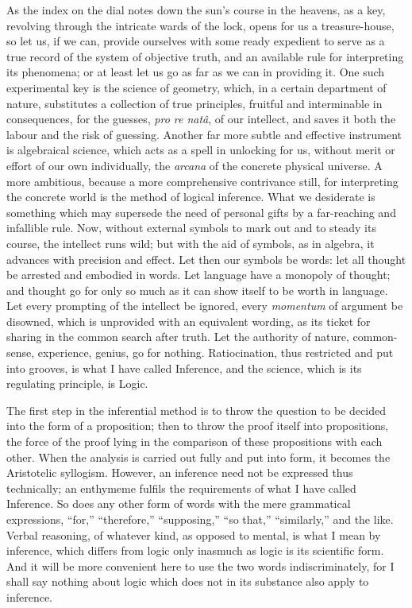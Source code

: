 As the index on the dial notes down the sun's course in the
heavens, as a key, revolving through the intricate wards of the lock,
opens for us a treasure-house, so let us, if we can, provide ourselves
with some ready expedient to serve as a true record of the system of
objective truth, and an available rule for interpreting its phenomena;
or at least let us go as far as we can in providing it. One such
experimental key is the science of geometry, which, in a certain
department of nature, substitutes a collection of true principles,
fruitful and interminable in consequences, for the guesses, \emph{pro re
natâ}, of our intellect, and saves it both the labour and the risk
of guessing. Another far more subtle and effective instrument is
algebraical science, which acts as a spell in unlocking for us,
without merit or effort of our own individually, the \emph{arcana} of
the concrete physical universe. A more ambitious, because a more
comprehensive contrivance still, for interpreting the concrete world
is the method of logical inference. What we desiderate is
something which may supersede the need of personal gifts by a
far-reaching and infallible rule. Now, without external symbols to
mark out and to steady its course, the intellect runs wild; but with
the aid of symbols, as in algebra, it advances with precision and
effect. Let then our symbols be words: let all thought be arrested and
embodied in words. Let language have a monopoly of thought; and
thought go for only so much as it can show itself to be worth in
language. Let every prompting of the intellect be ignored, every \emph{momentum} of argument be disowned, which is unprovided with an
equivalent wording, as its ticket for sharing in the common search
after truth. Let the authority of nature, common-sense, experience,
genius, go for nothing. Ratiocination, thus restricted and put into
grooves, is what I have called Inference, and the science, which is
its regulating principle, is Logic.

The first step in the inferential method is to throw the question
to be decided into the form of a proposition; then to throw the proof
itself into propositions, the force of the proof lying in the
comparison of these propositions with each other. When the analysis is
carried out fully and put into form, it becomes the Aristotelic
syllogism. However, an inference need not be expressed thus
technically; an enthymeme fulfils the requirements of what I have
called Inference. So does any other form of words with the mere
grammatical expressions, ``for,'' ``therefore,''
``supposing,'' ``so that,'' ``similarly,'' and
the like. Verbal reasoning, of whatever kind, as opposed to mental, is
what I mean by inference, which differs from logic only inasmuch
as logic is its scientific form. And it will be more convenient here
to use the two words indiscriminately, for I shall say nothing about
logic which does not in its substance also apply to inference.

